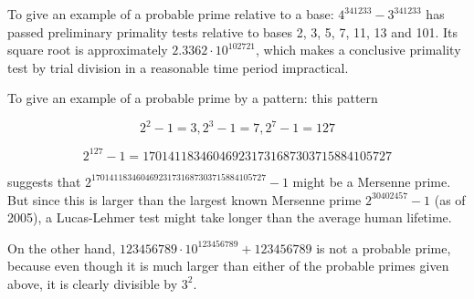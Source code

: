 \documentclass[12pt]{article}
\begin{document}
To give an example of a probable prime relative to a base: $4^{341233} - 3^{341233}$ has passed preliminary primality tests relative to bases 2, 3, 5, 7, 11, 13 and 101. Its square root is approximately $2.3362 \cdot 10^{102721}$, which makes a conclusive primality test by trial division in a reasonable time period impractical.

To give an example of a probable prime by a pattern: this pattern

$$2^2 - 1 = 3, 2^3 - 1 = 7, 2^7 - 1 = 127$$

$$2^{127} - 1 = 170141183460469231731687303715884105727$$

suggests that $2^{170141183460469231731687303715884105727} - 1$ might be a Mersenne prime. But since this is larger than the largest known Mersenne prime $2^{30402457} - 1$ (as of 2005), a Lucas-Lehmer test might take longer than the average human lifetime.

On the other hand, $123456789 \cdot 10^{123456789} + 123456789$ is not a probable prime, because even though it is much larger than either of the probable primes given above, it is clearly divisible by $3^2$.
\end{document}
